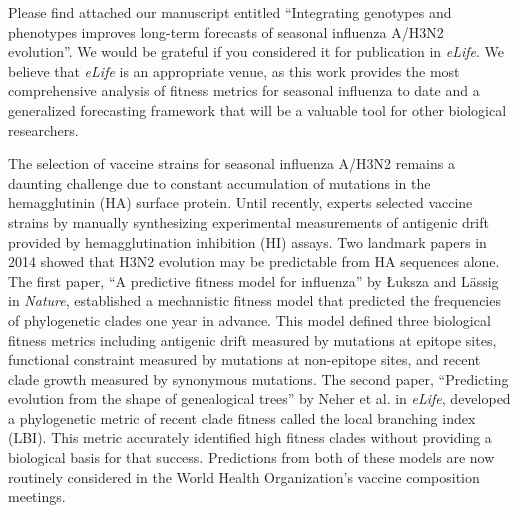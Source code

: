 \documentclass[stdletter,letterpaper,addrfromright,orderfromdateto,dateleft,11pt,noaddrto,sigleft]{newlfm}
\begin{document}
\begin{newlfm}
  Please find attached our manuscript entitled ``Integrating genotypes and phenotypes improves long-term forecasts of seasonal influenza A/H3N2 evolution''.
  We would be grateful if you considered it for publication in \textit{eLife}.
  We believe that \textit{eLife} is an appropriate venue, as this work provides the most comprehensive analysis of fitness metrics for seasonal influenza to date and a generalized forecasting framework that will be a valuable tool for other biological researchers.

  The selection of vaccine strains for seasonal influenza A/H3N2 remains a daunting challenge due to constant accumulation of mutations in the hemagglutinin (HA) surface protein.
  Until recently, experts selected vaccine strains by manually synthesizing experimental measurements of antigenic drift provided by hemagglutination inhibition (HI) assays.
  Two landmark papers in 2014 showed that H3N2 evolution may be predictable from HA sequences alone.
  The first paper, ``A predictive fitness model for influenza'' by {\L}uksza and L\"assig in \textit{Nature}, established a mechanistic fitness model that predicted the frequencies of phylogenetic clades one year in advance.
  This model defined three biological fitness metrics including antigenic drift measured by mutations at epitope sites, functional constraint measured by mutations at non-epitope sites, and recent clade growth measured by synonymous mutations.
  The second paper, ``Predicting evolution from the shape of genealogical trees'' by Neher et al. in \textit{eLife}, developed a phylogenetic metric of recent clade fitness called the local branching index (LBI).
  This metric accurately identified high fitness clades without providing a biological basis for that success.
  Predictions from both of these models are now routinely considered in the World Health Organization's vaccine composition meetings.


\end{newlfm}
\end{document}
